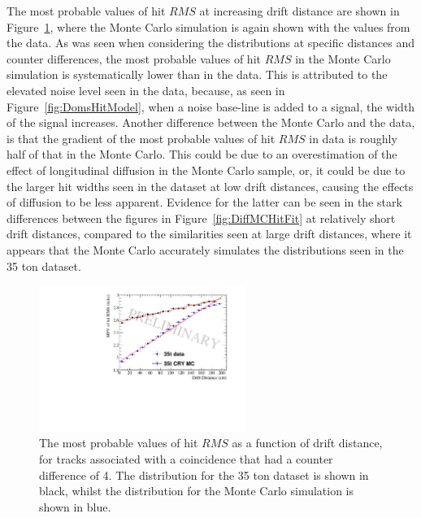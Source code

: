 The most probable values of hit $RMS$ at increasing drift distance are shown in Figure~\ref{fig:DiffMCDataCompFit}, where the Monte Carlo simulation is again shown with the values from the data. As was seen when considering the distributions at specific distances and counter differences, the most probable values of hit $RMS$ in the Monte Carlo simulation is systematically lower than in the data. This is attributed to the elevated noise level seen in the data, because, as seen in Figure~\ref{fig:DomsHitModel}, when a noise base-line is added to a signal, the width of the signal increases. Another difference between the Monte Carlo and the data, is that the gradient of the most probable values of hit $RMS$ in data is roughly half of that in the Monte Carlo. This could be due to an overestimation of the effect of longitudinal diffusion in the Monte Carlo sample, or, it could be due to the larger hit widths seen in the dataset at low drift distances, causing the effects of diffusion to be less apparent. Evidence for the latter can be seen in the stark differences between the figures in Figure~\ref{fig:DiffMCHitFit} at relatively short drift distances, compared to the similarities seen at large drift distances, where it appears that the Monte Carlo accurately simulates the distributions seen in the 35 ton dataset. \\

\begin{figure}
  \centering
  \includegraphics[width=0.6\textwidth]{CounterDiff4_Overlay}
  \caption[The drift distance dependence of diffusion in the 35 ton dataset and Monte Carlo for coincidences with a counter difference of 4]
          {The most probable values of hit $RMS$ as a function of drift distance, for tracks associated with a coincidence that had a counter difference of 4. The distribution for the 35 ton dataset is shown in black, whilst the distribution for the Monte Carlo simulation is shown in blue.}
  \label{fig:DiffMCDataCompFit}
\end{figure}

